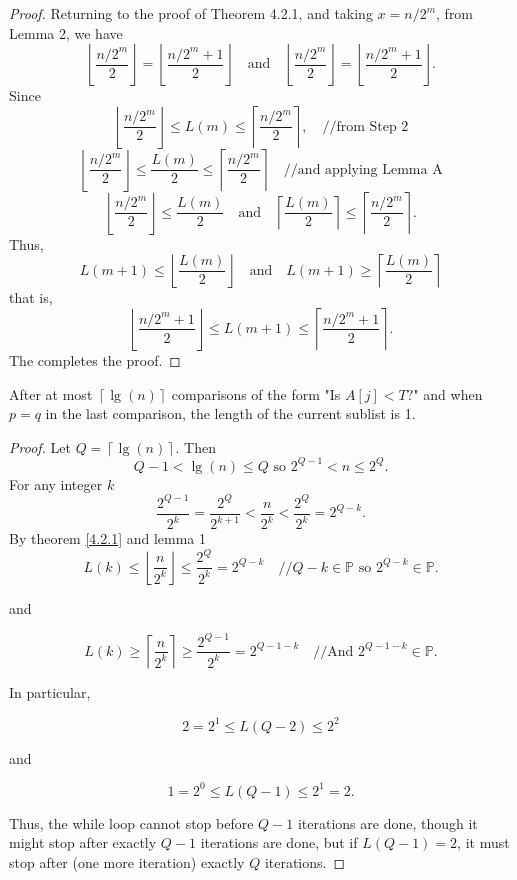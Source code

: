 \begin{proof}
        Returning to the proof of Theorem 4.2.1, and taking \(x = n/2^m\),  
        from Lemma 2, we have
        \[
        \left\lfloor \frac{n/2^m}{2} \right\rfloor = \left\lfloor \frac{n/2^m+1}{2} \right\rfloor \quad \text{and} \quad \left\lfloor \frac{n/2^m}{2} \right\rfloor = \left\lfloor \frac{n/2^m+1}{2} \right\rfloor.
        \]
        Since
        \[
        \left\lfloor \frac{n/2^m}{2} \right\rfloor \leq L(m) \leq \left\lceil \frac{n/2^m}{2} \right\rceil, \quad // \text{from Step 2}
        \]
        \[
        \left\lfloor \frac{n/2^m}{2} \right\rfloor \leq \frac{L(m)}{2} \leq \left\lceil \frac{n/2^m}{2} \right\rceil \quad // \text{and applying Lemma A}
        \]
        \[
        \left\lfloor \frac{n/2^m}{2} \right\rfloor \leq \frac{L(m)}{2} \quad \text{and} \quad \left\lceil \frac{L(m)}{2} \right\rceil \leq \left\lceil \frac{n/2^m}{2} \right\rceil.
        \]
        Thus,
        \[
        L(m+1) \leq \left\lfloor \frac{L(m)}{2} \right\rfloor \quad \text{and} \quad L(m+1) \geq \left\lceil \frac{L(m)}{2} \right\rceil
        \]
        that is,
        \[
        \left\lfloor \frac{n/2^m+1}{2} \right\rfloor \leq L(m+1) \leq \left\lceil \frac{n/2^m+1}{2} \right\rceil.
        \]
        The completes the proof.
    \end{proof}

    \begin{theorem}
        After at most \(\left\lceil \lg(n) \right\rceil\) comparisons of the form "Is \(A[j] < T?\)"  
        and when \(p = q\) in the last comparison, the length of the current sublist is 1.
    \end{theorem}
    \begin{proof}
        Let \(Q = \left\lceil \lg(n) \right\rceil\). Then
        \[
        Q - 1 < \lg(n) \leq Q \text{ so } 2^{Q-1} < n \leq 2^Q.
        \]
        For any integer \(k\)
        \[
        \frac{2^{Q-1}}{2^k} = \frac{2^Q}{2^{k+1}} < \frac{n}{2^k} < \frac{2^Q}{2^k} = 2^{Q-k}.
        \]
        By theorem \ref{4.2.1} and lemma 1
        \[
        L(k) \leq \left\lfloor \frac{n}{2^k} \right\rfloor \leq \frac{2^Q}{2^k} = 2^{Q-k} \quad // Q - k \in \mathbb{P} \text{ so } 2^{Q-k} \in \mathbb{P}.
        \]

        and

        \[
        L(k) \geq \left\lceil \frac{n}{2^k} \right\rceil \geq \frac{2^{Q-1}}{2^k} = 2^{Q-1-k} \quad // \text{And } 2^{Q-1-k} \in \mathbb{P}.
        \]

        In particular,

        \[
        2 = 2^1 \leq L(Q - 2) \leq 2^2
        \]

        and

        \[
        1 = 2^0 \leq L(Q - 1) \leq 2^1 = 2.
        \]

        Thus, the while loop cannot stop before \(Q - 1\) iterations are done, though it might stop after exactly \(Q - 1\) iterations are done, but if \(L(Q - 1) = 2\), it must stop after (one more iteration) exactly \(Q\) iterations.
    \end{proof}


